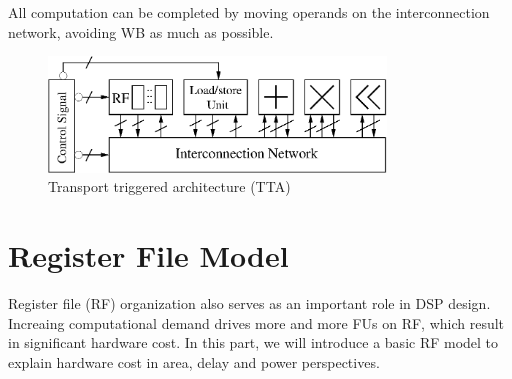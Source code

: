         All computation can be completed by moving operands on the interconnection network, avoiding WB as much as possible.
        \vspace{\textfig}
        \begin{figure}[!ht] 
            \centering
            \includegraphics[width=0.8\textwidth]{./figs/tta.eps}
            \caption{Transport triggered architecture (TTA)}
            \label{fig:tta}
        \end{figure}
      

    \section{Register File Model}
    Register file (RF) organization also serves as an important role in DSP design. 
    Increaing computational demand drives more and more FUs on RF,
    which result in significant hardware cost.
    In this part, we will introduce a basic RF model to explain hardware cost in area, delay and power perspectives.
